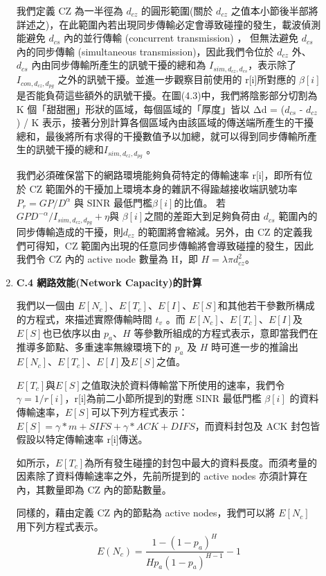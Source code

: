 \documentclass[12pt,a4paper]{article}
\begin{document}
\begin{description}
\begin{enumerate}
我們定義 CZ 為一半徑為 $d_{cz}$ 的圓形範圍(關於 $d_{cz}$ 之值本小節後半部將詳述之)，在此範圍內若出現同步傳輸必定會導致碰撞的發生，載波偵測能避免 $d_{cs}$ 內的並行傳輸 (concurrent transmission) ， 但無法避免 $d_{cs}$ 內的同步傳輸 (simultaneous transmission)，因此我們令位於 $d_{cz}$ 外、$d_{cs}$ 內由同步傳輸所產生的訊號干擾的總和為 
$I_{sim,d_{cz},d_{cs}}$，表示除了 $I_{con,d_{cz},d_{pg}}$ 之外的訊號干擾。並進一步觀察目前使用的 r[i]所對應的 $\beta[i]$是否能負荷這些額外的訊號干擾。在圖(4.3)中，我們將陰影部分切割為 K 個「甜甜圈」形狀的區域，每個區域的「厚度」皆以 Δd = ($d_{cs}$ - $d_{cz}$ ) / K 表示，接著分別計算各個區域內由該區域的傳送端所產生的干擾總和，最後將所有求得的干擾數值予以加總，就可以得到同步傳輸所產生的訊號干擾的總和$I_{sim,d_{cz},d_{pg}}$ 。

我們必須確保當下的網路環境能夠負荷特定的傳輸速率 r[i]，即所有位於 CZ 範圍外的干擾加上環境本身的雜訊不得踰越接收端訊號功率 $P_r = GP / D^{\alpha}$ 與 SINR 最低門檻$\beta[i]$的比值。
若 $GPD^{-\alpha} / { I_{sim,d_{cz},d_{pg}} +  \eta } $與 $\beta[i]$之間的差距大到足夠負荷由 $d_{cs}$ 範圍內的同步傳輸造成的干擾，則$d_{cz}$ 的範圍將會縮減。另外，由 CZ 的定義我們可得知，CZ 範圍內出現的任意同步傳輸將會導致碰撞的發生，因此我們令 CZ 內的 active node 數量為 H，即 $H =  \lambda \pi d_{cz}^2$。


\item [\bf ]{\textbf{\Kai C.4  網路效能(Network Capacity)的計算 }}\\
\vspace{-2mm}

我們以一個由 $E[N_c]$、$E[T_c]$、$E[I]$、$E[S]$和其他若干參數所構成的方程式，來描述實際傳輸時間 $t_v$ 。而 $E[N_c]$、$E[T_c]$、$E[I]$及$E[S]$也已依序以由 $p_a$、$H$ 等參數所組成的方程式表示，意即當我們在推導多節點、多重速率無線環境下的 $p_a$ 及 $H$ 時可進一步的推論出 $E[N_c]$、$E[T_c]$、$E[I]$及$E[S]$之值。

$E[T_c]$與$E[S]$之值取決於資料傳輸當下所使用的速率，我們令 $\gamma = 1/r[i]$，r[i]為前二小節所提到的對應 SINR 最低門檻 $\beta[i]$ 的資料傳輸速率，$E[S]$可以下列方程式表示： $E[S]=\gamma*m+SIFS+\gamma*ACK+DIFS$，而資料封包及 ACK 封包皆假設以特定傳輸速率 r[i]傳送。

如\cite{tn00_cali}所示，$E[T_c]$為所有發生碰撞的封包中最大的資料長度。而須考量的因素除了資料傳輸速率之外，先前所提到的 active nodes 亦須計算在內，其數量即為 CZ 內的節點數量。

同樣的，藉由定義 CZ 內的節點為 active nodes，我們可以將 $E[N_c]$ 用下列方程式表示。
$$
E(N_c) =  \frac{1-(1-p_a)^H}{Hp_a(1-p_a)^{H-1}} -1
$$


\end{enumerate}
\end{description}
\end{document}
